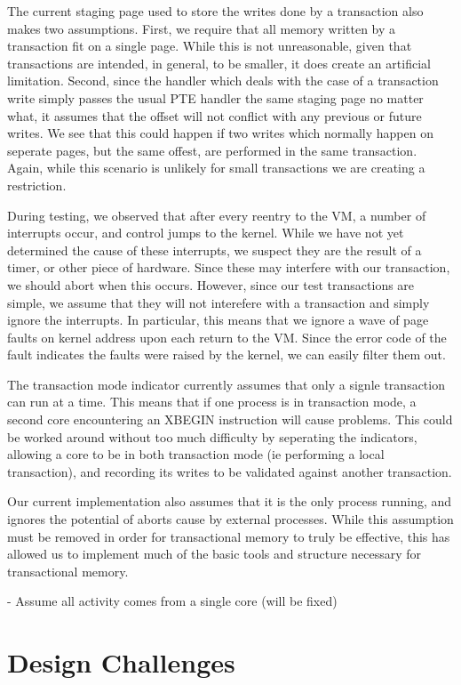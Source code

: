 \documentclass{acm_proc_article-sp}
\begin{document}
The current staging page used to store the writes done by a transaction also
makes two assumptions. First, we require that all memory written by a 
transaction fit on a single page. While this is not unreasonable, given that
transactions are intended, in general, to be smaller, it does create an
artificial limitation. Second, since the handler which deals with the case
of a transaction write simply passes the usual PTE handler the same staging
page no matter what, it assumes that the offset will not conflict with any
previous or future writes. We see that this could happen if two writes which
normally happen on seperate pages, but the same offest, are performed in the
same transaction. Again, while this scenario is unlikely for small transactions
we are creating a restriction.
 
During testing, we observed that after every reentry to the VM, a number
of interrupts occur, and control jumps to the kernel. While we have not yet
determined the cause of these interrupts, we suspect they are the result of 
a timer, or other piece of hardware. Since these may interfere with our 
transaction, we should abort when this occurs. However, since our test 
transactions are simple, we assume that they will not interefere with a 
transaction and simply ignore the interrupts. In particular, this means that
we ignore a wave of page faults on kernel address upon each return to the
VM. Since the error code of the fault indicates the faults were raised by
the kernel, we can easily filter them out.   

The transaction mode indicator currently assumes that only a signle 
transaction can run at a time. This means that if one process is in transaction
mode, a second core encountering an XBEGIN instruction will cause problems.
This could be worked around without too much difficulty by seperating the
indicators, allowing a core to be in both transaction mode (ie performing
a local transaction), and recording its writes to be validated against
another transaction.

Our current implementation also assumes that it is the only process running,
and ignores the potential of aborts cause by external processes. While this
assumption must be removed in order for transactional memory to truly be
effective, this has allowed us to implement much of the basic tools and
structure necessary for transactional memory.
 
- Assume all activity comes from a single core (will be fixed)

\section{Design Challenges}
\end{document}
